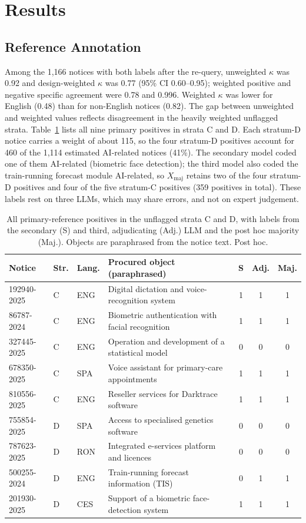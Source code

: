\documentclass[runningheads]{llncs}
\begin{document}
\section{Results}
\subsection{Reference Annotation}
Among the 1,166 notices with both labels after the re-query, unweighted $\kappa$ was 0.92 and design-weighted $\kappa$ was 0.77 (95\% CI 0.60--0.95); weighted positive and negative specific agreement were 0.78 and 0.996. Weighted $\kappa$ was lower for English (0.48) than for non-English notices (0.82). The gap between unweighted and weighted values reflects disagreement in the heavily weighted unflagged strata. Table~\ref{tab:cases} lists all nine primary positives in strata C and D. Each stratum-D notice carries a weight of about 115, so the four stratum-D positives account for 460 of the 1,114 estimated AI-related notices (41\%). The secondary model coded one of them AI-related (biometric face detection); the third model also coded the train-running forecast module AI-related, so $X_{\mathrm{maj}}$ retains two of the four stratum-D positives and four of the five stratum-C positives (359 positives in total). These labels rest on three LLMs, which may share errors, and not on expert judgement.

\begin{table}[t]
\caption{All primary-reference positives in the unflagged strata C and D, with labels from the secondary (S) and third, adjudicating (Adj.) LLM and the post hoc majority (Maj.). Objects are paraphrased from the notice text. Post hoc.}\label{tab:cases}
\centering
\begin{tabular}{llllccc}
\toprule
Notice & Str. & Lang. & Procured object (paraphrased) & S & Adj. & Maj. \\
\midrule
192940-2025 & C & ENG & Digital dictation and voice-recognition system & 1 & 1 & 1 \\
86787-2024  & C & ENG & Biometric authentication with facial recognition & 1 & 1 & 1 \\
327445-2025 & C & ENG & Operation and development of a statistical model & 0 & 0 & 0 \\
678350-2025 & C & SPA & Voice assistant for primary-care appointments & 1 & 1 & 1 \\
810556-2025 & C & ENG & Reseller services for Darktrace software & 1 & 1 & 1 \\
755854-2025 & D & SPA & Access to specialised genetics software & 0 & 0 & 0 \\
787623-2025 & D & RON & Integrated e-services platform and licences & 0 & 0 & 0 \\
500255-2024 & D & ENG & Train-running forecast information (TIS) & 0 & 1 & 1 \\
201930-2025 & D & CES & Support of a biometric face-detection system & 1 & 1 & 1 \\
\bottomrule
\end{tabular}
\end{table}
\end{document}
